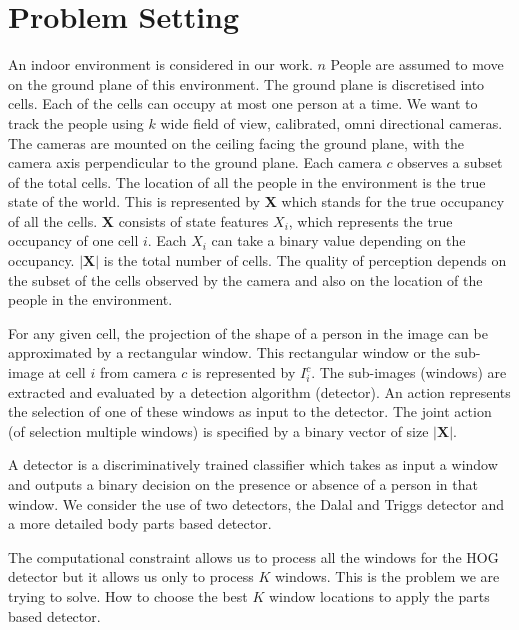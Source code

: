 \documentclass[10pt,twocolumn,letterpaper]{article}
\begin{document}

\section{Problem Setting}

An indoor environment is considered in our work. $ n$ People are assumed to move on the ground plane of this environment. The ground plane is discretised into cells. Each of the cells can occupy at most one person at a time. We want to track the people using $ k $ wide field of view, calibrated, omni directional cameras. The cameras are mounted on the ceiling facing the ground plane, with the camera axis perpendicular to the ground plane. Each camera $ c $ observes a subset of the total cells.  The location of all the people in the environment is the true state of the world. This is represented by  \textbf{X} which stands for the true occupancy of all the cells. \textbf{X} consists of state features $X_{i}$, which represents the true occupancy of one cell $ i$. Each $X_{i}$ can take a binary value depending on the occupancy. $|\textbf{X}| $ is the total number of cells. The quality of perception depends on the subset of the cells observed by the camera and also on the location of the people in the environment.

For any given cell, the projection of the shape of a person in the image can be approximated by a rectangular window. This rectangular window or the sub-image at cell $ i $ from camera $ c$ is represented by $ I^{c}_{i} $. The sub-images (windows) are extracted and evaluated by a detection algorithm (detector). An action represents the selection of one of these windows as input to the detector. The joint action (of selection multiple windows) is specified by a binary  vector of size $|\textbf{X}| $.

A detector is a discriminatively trained classifier which takes as input a window and outputs a binary decision on the presence or absence of a person in that window. We consider the use of two detectors, the Dalal and Triggs detector and a more detailed body parts based detector.

The computational constraint allows us to process all the windows for the HOG detector but it allows us only to process $ K $ windows. This is the problem we are trying to solve. How to choose the best $K$ window locations to apply the parts based detector.
\end{document}
